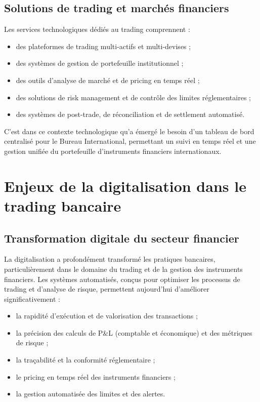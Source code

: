 \subsection{Solutions de trading et marchés financiers}

\hspace{1cm} Les services technologiques dédiés au trading comprennent :

\begin{itemize}
    \item des plateformes de trading multi-actifs et multi-devises ;
    \item des systèmes de gestion de portefeuille institutionnel ;
    \item des outils d'analyse de marché et de pricing en temps réel ;
    \item des solutions de risk management et de contrôle des limites réglementaires ;
    \item des systèmes de post-trade, de réconciliation et de settlement automatisé.
\end{itemize}

\hspace{1cm} C'est dans ce contexte technologique qu'a émergé le besoin d'un tableau de bord centralisé pour le Bureau International, permettant un suivi en temps réel et une gestion unifiée du portefeuille d'instruments financiers internationaux.

\section{Enjeux de la digitalisation dans le trading bancaire}

\subsection{Transformation digitale du secteur financier}

\hspace{1cm} La digitalisation a profondément transformé les pratiques bancaires, particulièrement dans le domaine du trading et de la gestion des instruments financiers. Les systèmes automatisés, conçus pour optimiser les processus de trading et d'analyse de risque, permettent aujourd'hui d'améliorer significativement :

\begin{itemize}
    \item la rapidité d'exécution et de valorisation des transactions ;
    \item la précision des calculs de P\&L (comptable et économique) et des métriques de risque ;
    \item la traçabilité et la conformité réglementaire ;
    \item le pricing en temps réel des instruments financiers ;
    \item la gestion automatisée des limites et des alertes.
\end{itemize}

